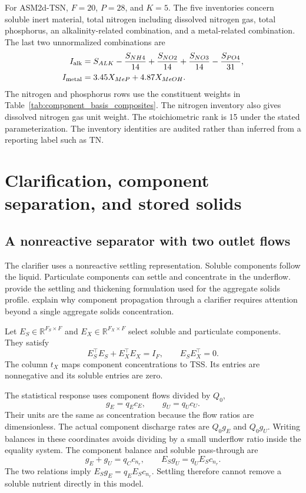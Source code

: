 For ASM2d-TSN, $F=20$, $P=28$, and $K=5$. The five inventories concern soluble inert material, total nitrogen including dissolved nitrogen gas, total phosphorus, an alkalinity-related combination, and a metal-related combination. The last two unnormalized combinations are
\begin{align}
I_{\rm alk}&=S_{ALK}-\frac{S_{NH4}}{14}
+\frac{S_{NO2}}{14}+\frac{S_{NO3}}{14}-\frac{S_{PO4}}{31},\\
I_{\rm metal}&=3.45X_{MeP}+4.87X_{MeOH}.
\label{eq:plant_named_invariants}
\end{align}
The nitrogen and phosphorus rows use the constituent weights in Table~\ref{tab:component_basis_composites}. The nitrogen inventory also gives dissolved nitrogen gas unit weight. The stoichiometric rank is 15 under the stated parameterization. The inventory identities are audited rather than inferred from a reporting label such as TN.

\section{Clarification, component separation, and stored solids}

\subsection{A nonreactive separator with two outlet flows}

The clarifier uses a nonreactive settling representation. Soluble components follow the liquid. Particulate components can settle and concentrate in the underflow. \citet{Takacs1991} provide the settling and thickening formulation used for the aggregate solids profile. \citet{JeppssonDiehl1996} explain why component propagation through a clarifier requires attention beyond a single aggregate solids concentration.

Let $E_S\in\mathbb R^{F_S\times F}$ and $E_X\in\mathbb R^{F_X\times F}$ select soluble and particulate components. They satisfy
\begin{equation}
E_S^\top E_S+E_X^\top E_X=I_F,\qquad E_SE_X^\top=0.
\end{equation}
The column $t_X$ maps component concentrations to TSS. Its entries are nonnegative and its soluble entries are zero.

The statistical response uses component flows divided by $Q_0$,
\begin{equation}
g_E=q_Ec_E,\qquad g_U=q_Uc_U.
\label{eq:plant_outlet_flows}
\end{equation}
Their units are the same as concentration because the flow ratios are dimensionless. The actual component discharge rates are $Q_0g_E$ and $Q_0g_U$. Writing balances in these coordinates avoids dividing by a small underflow ratio inside the equality system. The component balance and soluble pass-through are
\begin{equation}
g_E+g_U=q_Cc_{n_r},\qquad
E_Sg_U=q_UE_Sc_{n_r}.
\label{eq:plant_clarifier_equalities}
\end{equation}
The two relations imply $E_Sg_E=q_EE_Sc_{n_r}$. Settling therefore cannot remove a soluble nutrient directly in this model.

